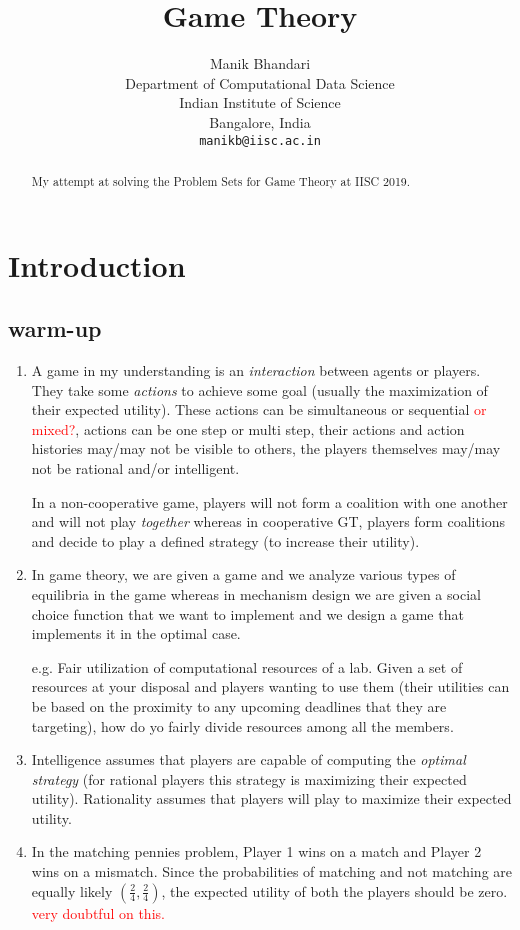 \documentclass{article}
\title{Game Theory}
\author{
	Manik Bhandari\\
	Department of Computational Data Science\\
	Indian Institute of Science\\
	Bangalore, India \\
	\texttt{manikb@iisc.ac.in} \\
}
\begin{document}
	
	\maketitle
	
	\begin{abstract}
		My attempt at solving the Problem Sets for Game Theory at IISC 2019.
	\end{abstract}
	
\section{Introduction}
\subsection{warm-up}
\begin{enumerate}
	\item A game in my understanding is an \textit{interaction} between agents or players. They take some \textit{actions} to achieve some goal (usually the maximization of their expected utility). These actions can be simultaneous or sequential \textcolor{red}{or mixed?}, actions can be one step or multi step, their actions and action histories may/may not be visible to others, the players themselves may/may not be rational and/or intelligent. 
	
	In a non-cooperative game, players will not form a coalition with one another and will not play \textit{together} whereas in cooperative GT, players form coalitions and decide to play a defined strategy (to increase their utility).
	\item In game theory, we are given a game and we analyze various types of equilibria in the game whereas in mechanism design we are given a social choice function that we want to implement and we design a game that implements it in the optimal case. 
	
	e.g. Fair utilization of computational resources of a lab. Given a set of resources at your disposal and players wanting to use them (their utilities can be based on the proximity to any upcoming deadlines that they are targeting), how do yo fairly divide resources among all the members.
	\item Intelligence assumes that players are capable of computing the \textit{optimal strategy} (for rational players this strategy is maximizing their expected utility). Rationality assumes that players will play to maximize their expected utility.
	\item In the matching pennies problem, Player 1 wins on a match and Player 2 wins on a mismatch. Since the probabilities of matching and not matching are equally likely $(\frac{2}{4}, \frac{2}{4})$, the expected utility of both the players should be zero. \textcolor{red}{very doubtful on this.}
\end{enumerate}
\end{document}
